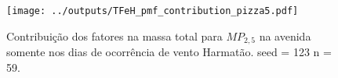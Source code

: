 \begin{landscape}
  \begin{figure}
    \centering
    \begin{minipage}[b]{0.45\linewidth}
      \texttt{[image: ../outputs/TFeH\_pmf\_contribution\_pizza5.pdf]}
      \caption{Contribuição dos fatores na massa total para $MP_{2,5}$ na avenida
               somente nos dias de ocorrência de vento Harmatão. seed = 123 n = 59.
               \label{fig:TFeH_contribution5}}
    \end{minipage}%
    \hspace{0.5cm}
    \begin{minipage}[b]{0.45\linewidth}
      
    \end{minipage}
  \end{figure}
\end{landscape}

